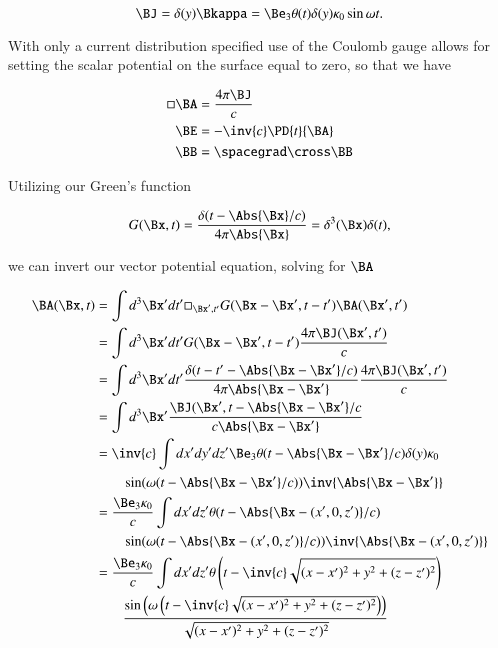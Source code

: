 \begin{equation}\label{eqn:relElectroDynProblemSet5P1:30}
\BJ = \delta(y) \Bkappa = \Be_3 \theta(t) \delta(y) \kappa_0 \sin\omega t.
\end{equation}

With only a current distribution specified use of the Coulomb gauge allows for setting the scalar potential on the surface equal to zero, so that we have

\begin{align}\label{eqn:relElectroDynProblemSet5P1:50}
\square \BA &= \frac{4 \pi \BJ}{c} \\
\BE &= - \inv{c} \PD{t}{\BA} \\
\BB &= \spacegrad \cross \BB
\end{align}

Utilizing our Green's function 

\begin{equation}\label{eqn:relElectroDynProblemSet5P1:70}
G(\Bx, t) = \frac{\delta(t - \Abs{\Bx}/c)}{4 \pi \Abs{\Bx}} = \delta^3(\Bx)\delta(t),
\end{equation}

we can invert our vector potential equation, solving for $\BA$

\begin{align*}
\BA(\Bx, t) 
&= \int d^3 \Bx' dt' \square_{\Bx', t'} G(\Bx - \Bx', t - t') \BA(\Bx', t') \\
&= \int d^3 \Bx' dt' G(\Bx - \Bx', t - t') \frac{4 \pi \BJ(\Bx', t')}{c} \\
&= \int d^3 \Bx' dt' 
\frac{\delta(t - t' - \Abs{\Bx -\Bx'}/c)}{4 \pi \Abs{\Bx - \Bx'}}
\frac{4 \pi \BJ(\Bx', t')}{c} \\
&= \int d^3 \Bx' 
\frac{\BJ(\Bx', t - \Abs{\Bx - \Bx'}/c}{c \Abs{\Bx - \Bx'}} \\
&= \inv{c} \int dx' dy' dz'
\Be_3 \theta(t - \Abs{\Bx -\Bx'}/c) \delta(y) \kappa_0  \\
&\qquad \sin(\omega(t - \Abs{\Bx -\Bx'}/c))
\inv{\Abs{\Bx - \Bx'}} \\
&= \frac{
\Be_3 \kappa_0
}{c} \int dx' dz'
\theta(t - \Abs{\Bx -(x', 0, z')}/c)  \\
&\qquad \sin(\omega(t - \Abs{\Bx -(x', 0, z')}/c))
\inv{\Abs{\Bx - (x', 0, z')}} \\
&= \frac{
\Be_3 \kappa_0
}{c} \int dx' dz'
\theta\left(t - \inv{c} \sqrt{(x-x')^2 + y^2 + (z-z')^2}\right)  \\
&\qquad \frac{\sin\left(\omega\left(t - \inv{c} \sqrt{(x-x')^2 + y^2 + (z-z')^2}\right)\right)}{\sqrt{(x-x')^2 + y^2 + (z-z')^2}}
\end{align*}

